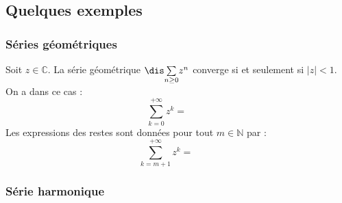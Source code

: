 \documentclass[french,11pt,twoside]{VcCours}
\newcommand{\Sum}[2]{\ensuremath{\textstyle{\sum\limits_{#1}^{#2}}}}
\begin{document}


\subsection{Quelques exemples}
\subsubsection{Séries géométriques}

\begin{thm} 
Soit $z \in \mathbb{C}$. La série géométrique $\dis \Sum{n \geq 0}{} z^n$ converge si et seulement si $\vert z \vert <1$. On a dans ce cas : 
$$ \sum_{k=0}^{+ \infty} z^k = \phantom{\frac{1}{1-z}}$$
Les expressions des restes sont données pour tout $m \in \mathbb{N}$ par :
$$ \sum_{k=m+1}^{+ \infty} z^k = \phantom{\frac{z^{m+1}}{1-z}}$$
\end{thm}

\begin{preuve}  

\vspace{9cm}
\end{preuve}

\subsubsection{Série harmonique}
\end{document}
